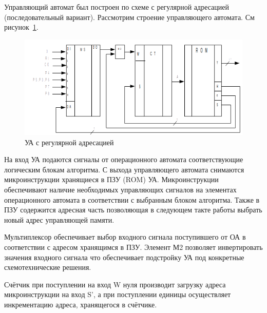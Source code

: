\documentclass[a4paper,14pt]{extarticle}
\begin{document}
Управляющий автомат был построен по схеме с регулярной адресацией (последовательный вариант). Рассмотрим строение управляющего автомата. См рисунок~\ref{fig:courseschemema}.

\begin{figure}[h!]
	\centering
	\includegraphics[width=0.8\linewidth]{images/course_ma_temp}
	\caption{УА с регулярной адресацией}
	\label{fig:courseschemema}
\end{figure}

На вход УА подаются сигналы от операционного автомата соответствующие логическим блокам алгоритма. С выхода управляющего автомата снимаются микроинструкции хранящиеся в ПЗУ (ROM) УА. Микроинструкции обеспечивают наличие необходимых управляющих сигналов на элементах операционного автомата в соответствии с выбранным блоком алгоритма. Также в ПЗУ содержится адресная часть позволяющая в следующем такте работы выбрать новый адрес управляющей памяти.

Мультиплексор обеспечивает выбор входного сигнала поступившего от ОА в соответствии с адресом хранящимся в ПЗУ.
Элемент М2 позволяет инвертировать значения входного сигнала что обеспечивает подстройку УА под конкретные схемотехнические решения.

Счётчик при поступлении на вход W нуля производит загрузку адреса микроинструкции на вход S', а при поступлении единицы осуществляет инкрементацию адреса, хранящегося в счётчике.
\end{document}

